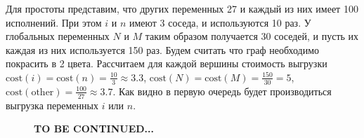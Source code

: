 \documentclass[12pt]{article}
\begin{document}
Для простоты представим, что других переменных 27 и каждый из них имеет 100 исполнений.
При этом $i$ и $n$ имеют 3 соседа, и используются 10 раз.
У глобальных переменных $N$ и $M$ таким образом получается 30 соседей, и пусть их каждая из них используется 150 раз.
Будем считать что граф необходимо покрасить в 2 цвета.
Рассчитаем для каждой вершины стоимость выгрузки $\text{cost}(i) = \text{cost}(n) = \frac{10}{3} \approx 3.3$, $\text{cost}(N) = \text{cost}(M) = \frac{150}{30} = 5$,
$\text{cost}(\text{other}) = \frac{100}{27} \approx 3.7$.
Как видно в первую очередь будет производиться выгрузка переменных $i$ или $n$.

\begin{figure}[H]
    \centering
\end{figure}


\begin{figure}[H]
    \centering
    \textbf{TO BE CONTINUED...}
\end{figure}
\end{document}
